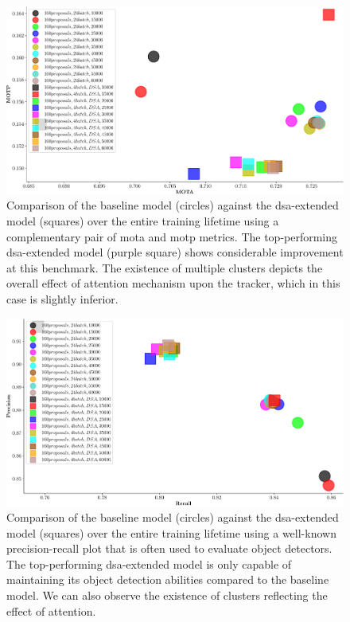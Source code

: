 \begin{figure}[t]
    \centerline{\includegraphics[width=\linewidth]{figures/siamese_tracking/tracker_cmp_160_2x12_vs_160_2x2_DSA_MOTA_MOTP.pdf}}
    \caption[\gls{dsa} evaluation - primary metrics]{Comparison of the baseline model (circles) against the \gls{dsa}-extended model (squares) over the entire training lifetime using a complementary pair of \gls{mota} and \gls{motp} metrics. The top-performing \gls{dsa}-extended model (purple square) shows considerable improvement at this benchmark. The existence of multiple clusters depicts the overall effect of attention mechanism upon the tracker, which in this case is slightly inferior.}
    \label{fig:OrigVsDSA_160RPN_MOTA_MOTP}
\end{figure}

\begin{figure}[t]
    \centerline{\includegraphics[width=\linewidth]{figures/siamese_tracking/tracker_cmp_160_2x12_vs_160_2x2_DSA_rec_prec.pdf}}
    \caption[\gls{dsa} evaluation - secondary metrics]{Comparison of the baseline model (circles) against the \gls{dsa}-extended model (squares) over the entire training lifetime using a well-known precision-recall plot that is often used to evaluate object detectors. The top-performing \gls{dsa}-extended model is only capable of maintaining its object detection abilities compared to the baseline model. We can also observe the existence of clusters reflecting the effect of attention.}
    \label{fig:OrigVsDSA_160RPN_Prec_Rec}
\end{figure}

